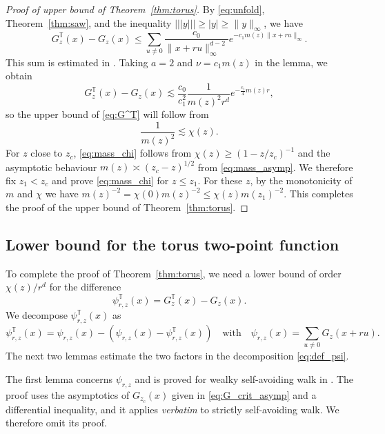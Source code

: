 \documentclass[11pt,hidelinks]{article}
\theoremstyle{plain}
\numberwithin{equation}{section}
\newcommand{\inv}{^{-1}}
\renewcommand{\(}{\left(}
\renewcommand{\)}{\right)}
\newcommand{\1}{\mathds{1}}
\providecommand{\abs}[1]{\lvert#1\rvert}
\providecommand{\norm}[1]{\lVert#1\rVert}
\newcommand{\mz}{m(z)}
\newcommand{\supT}{^{ \mathbb{T} }}
\newcommand{\subrz}{_{r,z}}
\newcommand{\veee}[1]{|\!|\!|#1|\!|\!|}
\providecommand{\nnnorm}[1]{\veee {#1} }
\newcommand{\crit}{_{z_c}}
\begin{document}
\begin{proof}[Proof of upper bound of Theorem~\ref{thm:torus}]
By \eqref{eq:unfold}, Theorem~\ref{thm:saw}, and the inequality $\nnnorm y \ge \abs y \ge \norm y_\infty$, we have
\begin{equation}
G_z\supT(x) - G_z(x)
\le \sum_{u\ne 0} \frac{ c_0 }{ \norm{x+ru}_\infty^{d-2} } e^{-c_1\mz \norm{x+ru}_\infty }.
\end{equation}
This sum is estimated in \cite[Lemma~4.2]{HMS23}. 
Taking $a=2$ and $\nu = c_1\mz$ in the lemma, we obtain 
\begin{equation}
G_z\supT(x) - G_z(x)
\lesssim \frac{c_0 }{ c_1^2} \frac 1 { \mz^2 r^d  } e^{-\frac {c_1} 4 \mz r },
\end{equation}
so the upper bound of \eqref{eq:G^T} will follow from 
\begin{equation} \label{eq:mass_chi}
\frac 1 { \mz^{2} } \lesssim \chi(z).
\end{equation}
For $z$ close to $z_c$, \eqref{eq:mass_chi} follows from $\chi(z) \ge (1- z/z_c)\inv$ and the asymptotic behaviour $\mz \asymp (z_c - z)^{1/2}$ from  \eqref{eq:mass_asymp}.
We therefore fix $z_1 < z_c$ and prove \eqref{eq:mass_chi} for $z \le z_1$. 
For these $z$, by the monotonicity of $m$ and $\chi$ we have
$\mz^{-2} =  \chi(0)\mz^{-2 } \le \chi(z) m(z_1)^{-2 }$.
This completes the proof of the upper bound of Theorem~\ref{thm:torus}.
\end{proof}





\subsection{Lower bound for the torus two-point function}
\label{sec:torus_lb}
To complete the proof of Theorem~\ref{thm:torus}, we need a lower bound of order $\chi(z)/r^d$ for the difference
\begin{equation}
\psi\subrz\supT (x) = G_z\supT(x) - G_z(x).
\end{equation}
We decompose $\psi\subrz\supT(x)$ as
\begin{equation} \label{eq:def_psi}
\psi\subrz\supT (x) = \psi\subrz(x) - ( \psi\subrz(x) - \psi\subrz\supT(x) )
\quad\text{with}\quad 
\psi\subrz(x) = \sum_{u\ne0} G_z(x+ru). 
\end{equation}
The next two lemmas estimate the two factors in the decomposition \eqref{eq:def_psi}. 

The first lemma concerns $\psi\subrz$ and is proved for wealky self-avoiding walk in \cite[(6.22)]{Slad23_wsaw}. 
The proof uses the asymptotics of $G\crit(x)$ given in \eqref{eq:G_crit_asymp} and a differential inequality, 
and it applies \emph{verbatim} to strictly self-avoiding walk. We therefore omit its proof. 
\end{document}
